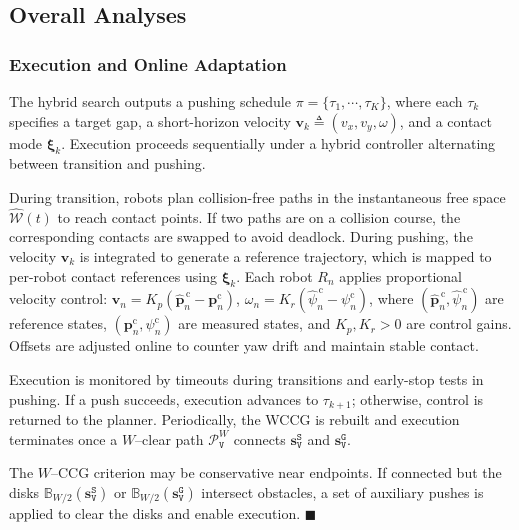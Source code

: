 \subsection{Overall Analyses}\label{subsec:overall}

\subsubsection{Execution and Online Adaptation}\label{subsec:execute}
The hybrid search outputs a pushing schedule
$\pi=\{\tau_1,\cdots,\tau_K\}$, where each $\tau_k$ specifies a target gap, a
short-horizon velocity $\mathbf{v}_k\triangleq(v_x,v_y,\omega)$, and a contact
mode $\boldsymbol{\xi}_k$. Execution proceeds sequentially under a hybrid
controller alternating between transition and pushing.

During transition, robots plan collision-free paths in the instantaneous
free space $\widehat{\mathcal{W}}(t)$ to reach contact points.
If two paths are on a collision course, the corresponding contacts are swapped to
avoid deadlock. During pushing, the velocity $\mathbf{v}_k$ is integrated to
generate a reference trajectory,
which is mapped to per-robot contact references using $\boldsymbol{\xi}_k$.
Each robot $R_n$ applies proportional
velocity control:
$\mathbf{v}_n = K_{\!p}(\widehat{\mathbf{p}}^{\,\text{c}}_n-\mathbf{p}^{\text{c}}_n)$,
$\omega_n = K_{\!r}(\widehat{\psi}^{\,\text{c}}_n-\psi^{\text{c}}_n)$,
where $(\widehat{\mathbf{p}}^{\,\text{c}}_n,\widehat{\psi}^{\,\text{c}}_n)$ are
reference states, $(\mathbf{p}^{\text{c}}_n,\psi^{\text{c}}_n)$ are measured
states, and $K_{\!p},K_{\!r}>0$ are control gains.
Offsets are adjusted online to counter yaw drift and maintain stable contact.

Execution is monitored by timeouts during transitions and early-stop tests in pushing.
If a push succeeds, execution advances to $\tau_{k+1}$; otherwise,
control is returned to the planner. Periodically, the WCCG is rebuilt and
execution terminates once a $W$--clear path $\mathcal{P}^W_\texttt{V}$ connects
$\mathbf{s}_\texttt{V}^{\texttt{S}}$ and $\mathbf{s}_\texttt{V}^{\texttt{G}}$.

\begin{remark}
The $W$--CCG criterion may be conservative near endpoints. If connected
but the disks $\mathbb{B}_{W/2}(\mathbf{s}_\texttt{V}^{\texttt{S}})$ or
$\mathbb{B}_{W/2}(\mathbf{s}_\texttt{V}^{\texttt{G}})$ intersect obstacles, a
set of auxiliary pushes is applied to clear the disks and enable
execution. \hfill$\blacksquare$
\end{remark}


